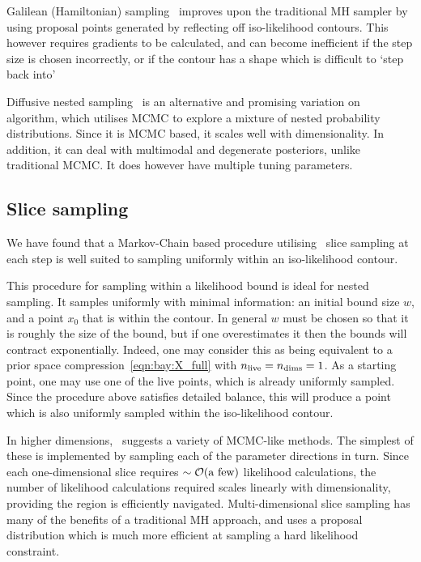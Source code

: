 Galilean (Hamiltonian) sampling~\citep{GalileanNestedSampling,Betancourt2011} improves upon the traditional MH sampler by using proposal points generated by reflecting off iso-likelihood contours. This however requires gradients to be calculated, and can become inefficient if the step size is chosen incorrectly, or if the contour has a shape which is difficult to `step back into'

Diffusive nested sampling~\citep{DiffusiveNestedSampling} is an alternative and promising variation on~ algorithm, which utilises MCMC to explore a mixture of nested probability distributions. Since it is MCMC based, it scales well with dimensionality. In addition, it can deal with multimodal and degenerate posteriors, unlike traditional MCMC\@. It does however have multiple tuning parameters.


\subsection{Slice sampling}
\label{sec:bay:slice_sampling}
We have found that a Markov-Chain based procedure utilising~ slice sampling at each step is well suited to sampling uniformly within an iso-likelihood contour.

This procedure for sampling within a likelihood bound is ideal for nested sampling. It samples uniformly with minimal information: an initial bound size $w$, and a point $x_0$ that is within the contour. In general $w$ must be chosen so that it is roughly the size of the bound, but if one overestimates it then the bounds will contract exponentially. Indeed, one may consider this as being equivalent to a prior space compression~\eqref{eqn:bay:X_full} with $n_{\mathrm{live}}=n_{\mathrm{dims}}=1$. As a starting point, one may use one of the live points, which is already uniformly sampled. Since the procedure above satisfies detailed balance, this will produce a point which is also uniformly sampled within the iso-likelihood contour.

In higher dimensions,~\cite{NealSlice} suggests a variety of MCMC-like methods. The simplest of these is implemented by sampling each of the parameter directions in turn. Since each one-dimensional slice requires ${\sim\mathcal{O}{\left(\text{a few}\right)}}$ likelihood calculations, the number of likelihood calculations required scales linearly with dimensionality, providing the region is efficiently navigated. Multi-dimensional slice sampling has many of the benefits of a traditional MH approach, and uses a proposal distribution which is much more efficient at sampling a hard likelihood constraint.

